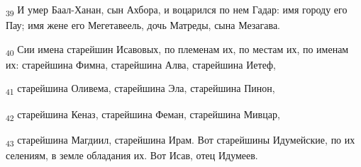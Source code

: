 \begin{tcolorbox}
\textsubscript{39} И умер Баал-Ханан, сын Ахбора, и воцарился по нем Гадар: имя городу его Пау; имя жене его Мегетавеель, дочь Матреды, сына Мезагава.
\end{tcolorbox}
\begin{tcolorbox}
\textsubscript{40} Сии имена старейшин Исавовых, по племенам их, по местам их, по именам их: старейшина Фимна, старейшина Алва, старейшина Иетеф,
\end{tcolorbox}
\begin{tcolorbox}
\textsubscript{41} старейшина Оливема, старейшина Эла, старейшина Пинон,
\end{tcolorbox}
\begin{tcolorbox}
\textsubscript{42} старейшина Кеназ, старейшина Феман, старейшина Мивцар,
\end{tcolorbox}
\begin{tcolorbox}
\textsubscript{43} старейшина Магдиил, старейшина Ирам. Вот старейшины Идумейские, по их селениям, в земле обладания их. Вот Исав, отец Идумеев.
\end{tcolorbox}
